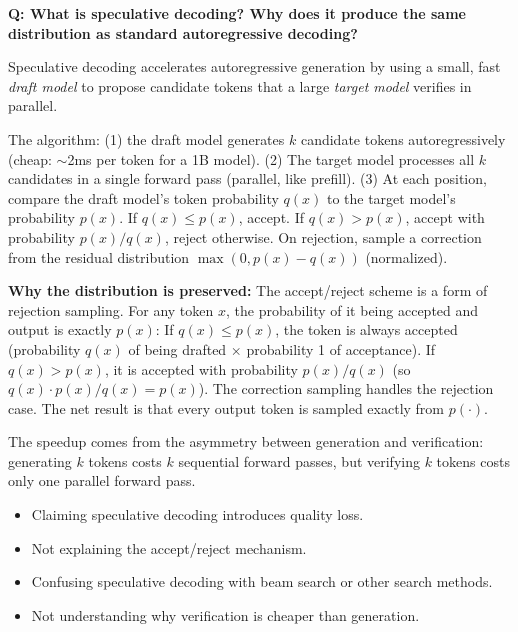 \begin{interviewq}
\textbf{Q: What is speculative decoding?  Why does it produce the same distribution as
standard autoregressive decoding?}

 \quad {} \quad \badgefreq{\freqmed}

\stronganswer
Speculative decoding accelerates autoregressive generation by using a small, fast
\emph{draft model} to propose candidate tokens that a large \emph{target model} verifies
in parallel.

The algorithm: (1) the draft model generates $k$ candidate tokens autoregressively (cheap:
$\sim$2ms per token for a 1B model).  (2) The target model processes all $k$ candidates
in a single forward pass (parallel, like prefill).  (3) At each position, compare the
draft model's token probability $q(x)$ to the target model's probability $p(x)$.  If
$q(x) \leq p(x)$, accept.  If $q(x) > p(x)$, accept with probability $p(x)/q(x)$,
reject otherwise.  On rejection, sample a correction from the residual distribution
$\max(0, p(x) - q(x))$ (normalized).

\textbf{Why the distribution is preserved:}  The accept/reject scheme is a form of
rejection sampling.  For any token $x$, the probability of it being accepted and output
is exactly $p(x)$:  If $q(x) \leq p(x)$, the token is always accepted (probability
$q(x)$ of being drafted $\times$ probability 1 of acceptance).  If $q(x) > p(x)$, it is
accepted with probability $p(x)/q(x)$ (so $q(x) \cdot p(x)/q(x) = p(x)$).  The
correction sampling handles the rejection case.  The net result is that every output
token is sampled exactly from $p(\cdot)$.

The speedup comes from the asymmetry between generation and verification: generating
$k$ tokens costs $k$ sequential forward passes, but verifying $k$ tokens costs only
one parallel forward pass.

\redflags
\begin{itemize}
    \item Claiming speculative decoding introduces quality loss.
    \item Not explaining the accept/reject mechanism.
    \item Confusing speculative decoding with beam search or other search methods.
    \item Not understanding why verification is cheaper than generation.
\end{itemize}


\end{interviewq}
